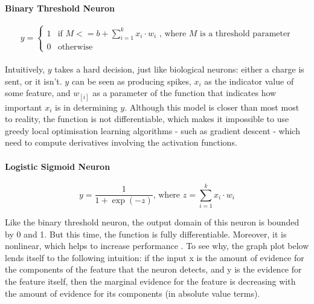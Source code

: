 \documentclass[a4paper,11pt]{article}
\begin{document}
\paragraph{Binary Threshold Neuron}
\begin{equation}
y = \begin{cases} 1 & \mbox{if } M <= b + \sum\limits_{i=1}^k x_{i}\cdot w_{i}  \text{ , where } M \text{ is a threshold parameter} \\ 
				  0 & \mbox{otherwise} \end{cases}
\end{equation} \\

Intuitively, $y$ takes a hard decision, just like biological neurons: either a charge is sent, or it isn't. $y$ can be seen as producing spikes, $x_{i}$ as the indicator value of some feature, and $w_[i]$ as a parameter of the function that indicates how important $x_{i}$ is in determining $y$. Although this model is closer than most most to reality, the function is not differentiable, which makes it impossible to use greedy local optimisation learning algorithms - such as gradient descent - which need to compute derivatives involving the activation functions.

\paragraph{Logistic Sigmoid Neuron} 
\begin{equation}
\label{sigmoid neuron}
y = \frac{1}{1 + \exp(-z)} \text{, where } z = \sum\limits_{i=1}^k x_{i}\cdot w_{i}
\end{equation}

Like the binary threshold neuron, the output domain of this neuron is bounded by 0 and 1. But this time, the function is fully differentiable. Moreover, it is nonlinear, which helps to increase performance \cite{DL-book}. To see why, the graph plot below lends itself to the following intuition: if the input x is the amount of evidence for the components of the feature that the neuron detects, and y is the evidence for the feature itself, then the marginal evidence for the feature is decreasing with the amount of evidence for its components (in absolute value terms). 
\end{document}
